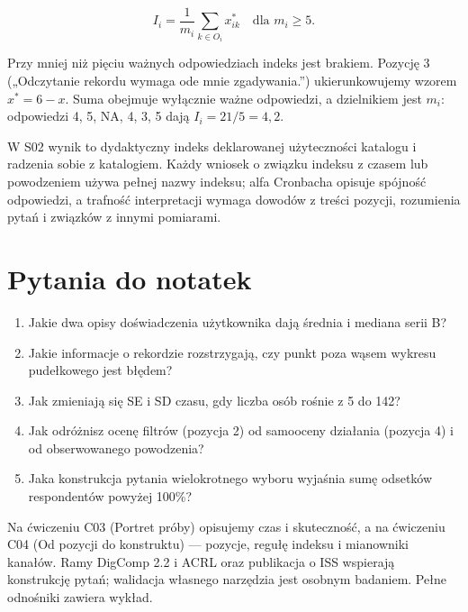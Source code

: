 \documentclass[
  polish,
  11pt,
  a4paper,
]{article}
\providecommand{\tightlist}{%
  \setlength{\itemsep}{0pt}\setlength{\parskip}{0pt}}
\begin{document}
\[I_i=\frac{1}{m_i}\sum_{k\in O_i}x^*_{ik}\quad\text{dla }m_i\geq5 .\]

Przy mniej niż pięciu ważnych odpowiedziach indeks jest brakiem. Pozycję
3 („Odczytanie rekordu wymaga ode mnie zgadywania.'') ukierunkowujemy
wzorem \(x^*=6-x\). Suma obejmuje wyłącznie ważne odpowiedzi, a
dzielnikiem jest \(m_i\): odpowiedzi 4, 5, NA, 4, 3, 5 dają
\(I_i=21/5=4{,}2\).

W S02 wynik to dydaktyczny indeks deklarowanej użyteczności katalogu i
radzenia sobie z katalogiem. Każdy wniosek o związku indeksu z czasem
lub powodzeniem używa pełnej nazwy indeksu; alfa Cronbacha opisuje
spójność odpowiedzi, a trafność interpretacji wymaga dowodów z treści
pozycji, rozumienia pytań i związków z innymi pomiarami.

\section{Pytania do notatek}\label{pytania-do-notatek}

\begin{enumerate}
\def\labelenumi{\arabic{enumi}.}
\tightlist
\item
  Jakie dwa opisy doświadczenia użytkownika dają średnia i mediana serii
  B?
\item
  Jakie informacje o rekordzie rozstrzygają, czy punkt poza wąsem
  wykresu pudełkowego jest błędem?
\item
  Jak zmieniają się SE i SD czasu, gdy liczba osób rośnie z 5 do 142?
\item
  Jak odróżnisz ocenę filtrów (pozycja 2) od samooceny działania
  (pozycja 4) i od obserwowanego powodzenia?
\item
  Jaka konstrukcja pytania wielokrotnego wyboru wyjaśnia sumę odsetków
  respondentów powyżej 100\%?
\end{enumerate}

Na ćwiczeniu C03 (Portret próby) opisujemy czas i skuteczność, a na
ćwiczeniu C04 (Od pozycji do konstruktu) --- pozycje, regułę indeksu i
mianowniki kanałów. Ramy DigComp 2.2 i ACRL oraz publikacja o ISS
wspierają konstrukcję pytań; walidacja własnego narzędzia jest osobnym
badaniem. Pełne odnośniki zawiera wykład.
\end{document}
